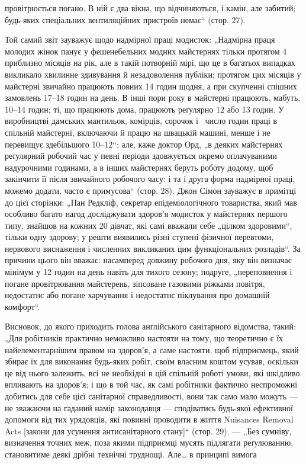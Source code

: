 \parcont{}  %
провітрюється погано. В ній є два вікна, що відчиняються, і камін,
але забитий; будь-яких спеціальних вентиляційних пристроїв немає“ (стор. 27).

Той самий звіт зауважує щодо надмірної праці модисток:
„Надмірна праця молодих жінок панує у фешенебельних модних майстернях тільки протягом 4 приблизно
місяців на рік,
але в такій потворній мірі, що це в багатьох випадках викликало хвилинне здивування й незадоволення
публіки; протягом
цих місяців у майстерні звичайно працюють повних 14 годин
щодня, а при скупченні спішних замовлень 17--18 годин на день.
В інші пори року в майстерні працюють, мабуть, 10--14 годин;
ті, що працюють дома, працюють реґулярно 12 або 13 годин.
У виробництві дамських мантильок, комірців, сорочок і~
число годин праці в спільній майстерні, включаючи й працю на
швацькій машині, менше і не перевищує здебільшого 10--12“;
але, каже доктор Орд, „в деяких майстернях реґулярний робочий час у певні періоди здовжується окремо
оплачуваними надурочними годинами, а в інших майстернях беруть роботу додому, щоб закінчити її після
звичайного робочого часу: і та
і друга форма надмірної праці, можемо додати, часто є примусова“ (стор. 28). Джон Сімон зауважує в
примітці до цієї сторінки: „Пан Редкліф, секретар епідеміологічного товариства,
який мав особливо багато нагод досліджувати здоров’я модисток
у майстернях першого типу, знайшов на кожних 20 дівчат, які
самі вважали себе „цілком здоровими“, тільки одну здорову;
у решти виявились різні ступені фізичної перевтоми, нервового
виснаження і численних викликаних цим функціональних розладів“.
За причини цього він вважає: насамперед довжину робочого
дня, яку він визначає мінімум у 12 годин на день навіть для
тихого сезону; подруге, „переповнення і погане провітрювання
майстерень, зіпсоване газовими ріжками повітря, недостатнє
або погане харчування і недостатнє піклування про домашній
комфорт“.

Висновок, до якого приходить голова англійського санітарного відомства, такий: „Для робітників
практично неможливо
настояти на тому, що теоретично є їх найелементарнішим правом
на здоров’я, а саме настояти, щоб підприємець, який збирає
їх для виконання будь-яких робіт, своїм власним коштом усував,
оскільки це від нього залежить, всі не необхідні в цій спільній
роботі умови, які шкідливо впливають на здоров’я; і що в той
час, як самі робітники фактично неспроможні добитись для себе
цієї санітарної справедливості, вони так само мало можуть —
не зважаючи на гаданий намір законодавця — сподіватись будь-якої ефективної допомоги від тих
урядовців, які повинні проводити в життя Nuisances Removal Acts [закони для усунення антисанітарного
стану]“ (стор. 29). — „Без сумніву, визначення точних меж, поза якими підприємці мусять підлягати
реґулюванню, становитиме деякі дрібні технічні труднощі. Але\dots{} в принципі вимога
\parbreak{}  %
